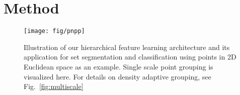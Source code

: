 \documentclass{article}
\newcommand{\rqi}[1]{{\textcolor{blue}{[\emph{CQ}: #1]}}}
\begin{document}
\begin{comment}
\subsection{Properties of Point Sets in Metric Spaces}
\rqi{Shall we shorten this paragraph to fit Section 1 and 2 into the first two pages?}

As a set, points are unordered requiring the network to be permutation invariant to all possible input orders.

Compared with generic sets, points sampled from a metric space have two additional properties:
\begin{itemize}
    \item Point-to-point relations are defined by a metric. While previous works like PointNet and Deep Sets have looked into the problem of learning representations for generic sets, they consider each point in the set as an independent element and relied on the global normalization of points to effectively aggregate point information by a max or average operation. Therefore, the generic set network only learns single point embedding or global point set feature. In our network, we regard the metric distance as first-class citizen and explicitly model point-to-point relations and learn local context features at increasing scales.
    
    \item Variable sampling density in local neighborhoods defined by the metric. While there is no clear definition of sampling density in a generic set, we can define sampling density in point sets sampled from a metric space. There is no guarantee that a model trained or tuned at certain sampling density would perform well at another density at test time. It is also likely that sampling density varies in different regions in the metric space at test time. The model needs to adapt to sampling densities and use its ``best judgement'' to extract useful and reliable features in those regions. 
    
\end{itemize}
\end{comment} 
\section{Method}
\begin{figure}[ht!]
    \vspace{-0.3cm}
    \centering
    \texttt{[image: fig/pnpp]}
    \caption{Illustration of our hierarchical feature learning architecture and its application for set segmentation and classification using points in 2D Euclidean space as an example. Single scale point grouping is visualized here. For details on density adaptive grouping, see Fig.~\ref{fig:multiscale}}
    \label{fig:pnpp}
    \vspace{-0.5cm}
\end{figure}
\end{document}

